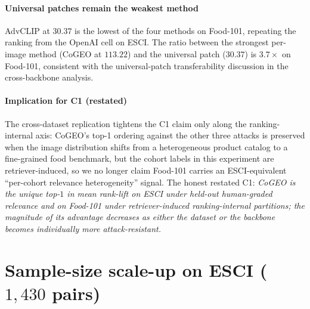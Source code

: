 \paragraph{Universal patches remain the weakest method} AdvCLIP at $30.37$ is the lowest of the four methods on Food-101, repeating the ranking from the OpenAI cell on ESCI. The ratio between the strongest per-image method (CoGEO at $113.22$) and the universal patch ($30.37$) is $3.7\times$ on Food-101, consistent with the universal-patch transferability discussion in the cross-backbone analysis.

\paragraph{Implication for C1 (restated)} The cross-dataset replication tightens the C1 claim only along the ranking-internal axis: CoGEO's top-1 ordering against the other three attacks is preserved when the image distribution shifts from a heterogeneous product catalog to a fine-grained food benchmark, but the cohort labels in this experiment are retriever-induced, so we no longer claim Food-101 carries an ESCI-equivalent ``per-cohort relevance heterogeneity'' signal. The honest restated C1: \emph{CoGEO is the unique top-$1$ in mean rank-lift on ESCI under held-out human-graded relevance and on Food-101 under retriever-induced ranking-internal partitions; the magnitude of its advantage decreases as either the dataset or the backbone becomes individually more attack-resistant.}

\section{\texorpdfstring{Sample-size scale-up on ESCI ($1{,}430$ pairs)}{Sample-size scale-up on ESCI (1430 pairs)}}
\label{sm:esci-scaleup}

